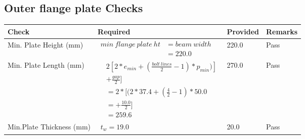 \documentclass{article}%
\begin{document}
%
\newpage%
\subsection{Outer flange plate Checks}%
\label{subsec:OuterflangeplateChecks}%
\renewcommand{\arraystretch}{1.2}%
\begin{longtable}{|p{4cm}|p{6cm}|p{5.5cm}|p{1.5cm}|}%
\hline%
\rowcolor{OsdagGreen}%
Check&Required&Provided&Remarks\\%
\hline%
\endhead%
\hline%
Min. Plate Height (mm)&$\begin{aligned}min~flange~plate~ht &= beam~width\\ &=220.0\end{aligned}$&220.0&Pass\\%
\hline%
Min. Plate Length (mm)&$\begin{aligned} & 2[2*e_{min} + ({\frac{bolt~lines}{2}}-1) * p_{min})]\\ & +\frac{gap}{2}]\\ &=2*[(2*37.4 + (\frac{4}{2}-1) * 50.0\\ &= + \frac{10.0}{2}]\\ &=259.6\end{aligned}$&270.0&Pass\\%
\hline%
Min.Plate Thickness (mm)&$\begin{aligned} t_w=19.0\end{aligned}$&20.0&Pass\\%
\hline%
\end{longtable}

%
\newpage%
\end{document}
